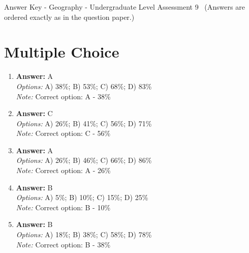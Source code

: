 \documentclass[12pt]{article}
\begin{document}
\begin{center}
Answer Key - Geography - Undergraduate Level Assessment 9 \
\small (Answers are ordered exactly as in the question paper.)
\end{center}

\section*{Multiple Choice}
\begin{enumerate}[label=\arabic*.]
\item \textbf{Answer:} A
\\ \textit{Options:} A) 38\%; B) 53\%; C) 68\%; D) 83\%
\\ \textit{Note:} Correct option: A - 38\%
\item \textbf{Answer:} C
\\ \textit{Options:} A) 26\%; B) 41\%; C) 56\%; D) 71\%
\\ \textit{Note:} Correct option: C - 56\%
\item \textbf{Answer:} A
\\ \textit{Options:} A) 26\%; B) 46\%; C) 66\%; D) 86\%
\\ \textit{Note:} Correct option: A - 26\%
\item \textbf{Answer:} B
\\ \textit{Options:} A) 5\%; B) 10\%; C) 15\%; D) 25\%
\\ \textit{Note:} Correct option: B - 10\%
\item \textbf{Answer:} B
\\ \textit{Options:} A) 18\%; B) 38\%; C) 58\%; D) 78\%
\\ \textit{Note:} Correct option: B - 38\%
\end{enumerate}
\end{document}
